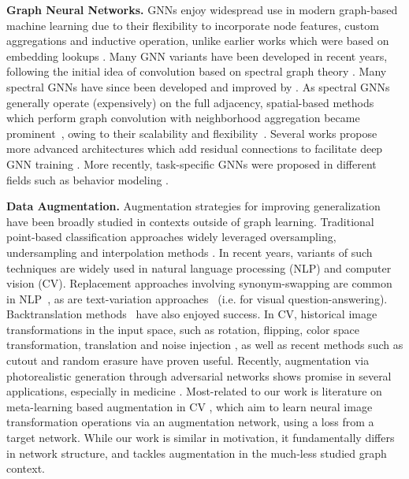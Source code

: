 \documentclass[letterpaper]{article} \usepackage{aaai21}  \usepackage{times}  \usepackage{helvet} \usepackage{courier}  \usepackage[hyphens]{url}  \usepackage{graphicx} \urlstyle{rm} \def\UrlFont{\rm}  \usepackage{natbib}  \usepackage{caption} \frenchspacing  \setlength{\pdfpagewidth}{8.5in}  \setlength{\pdfpageheight}{11in}
\begin{document}
\noindent \textbf{Graph Neural Networks.} GNNs enjoy widespread use in modern graph-based machine learning due to their flexibility to incorporate node features, custom aggregations and inductive operation, unlike earlier works which were based on embedding lookups \cite{perozzi2014deepwalk, wang2016structural, tang2015line}. Many GNN variants have been developed in recent years, following the initial idea of convolution based on spectral graph theory \cite{bruna2013spectral}. Many spectral GNNs have since been developed and improved by  \cite{defferrard2016convolutional,kipf2016semi,henaff2015deep,li2018adaptive,levie2018cayleynets,ma2020unified}.  As spectral GNNs generally operate (expensively) on the full adjacency, spatial-based methods which perform graph convolution with neighborhood aggregation became prominent~\cite{hamilton2017inductive,velivckovic2017graph,monti2017geometric,gao2018large,niepert2016learning}, owing to their scalability and flexibility~\cite{ying2018graph}.  Several works propose more advanced architectures which add residual connections to facilitate deep GNN training \cite{xu2018representation, li2019deepgcns,verma2019graphmix}. 
More recently, task-specific GNNs were proposed in different fields such as behavior modeling \cite{wang2020calendar,zhao2020error,yu2020identifying}.


\noindent \textbf{Data Augmentation.} Augmentation strategies for improving generalization have been broadly studied in contexts outside of graph learning.  Traditional point-based classification approaches widely leveraged oversampling, undersampling and interpolation methods \cite{chawla2002smote,barandela2004imbalanced}.  In recent years, variants of such techniques are widely used in natural language processing (NLP) and computer vision (CV). Replacement approaches involving synonym-swapping are common in NLP~\cite{zhang2016synonym}, as are text-variation approaches~\cite{kafle-etal-2017-data} (i.e. for visual question-answering). Backtranslation methods~\cite{sennrich-etal-2016-backtrasnlation,xie2019unsupervised,edunov-etal-2018-bt-at-scale} 
have also enjoyed success.  In CV, historical image transformations in the input space, such as rotation, flipping, color space transformation, translation and noise injection \cite{shorten2019survey}, as well as recent methods such as cutout and random erasure \cite{devries2017improved, zhong2017random} have proven useful.  Recently,  augmentation via photorealistic generation through adversarial networks shows promise in several applications, especially in medicine \cite{antoniou2017data, goodfellow2014generative}.  Most-related to our work is literature on meta-learning based augmentation in CV \cite{lemley2017smart, cubuk2019autoaugment,perez2017effectiveness}, which aim to learn neural image transformation operations via an augmentation network, using a loss from a target network.  While our work is similar in motivation, it fundamentally differs in network structure, and tackles augmentation in the much-less studied graph context.
\end{document}
